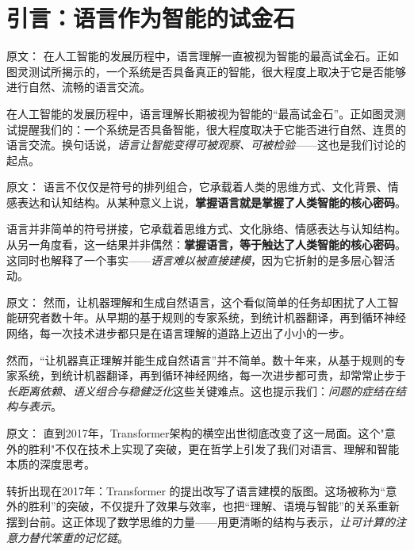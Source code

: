\section{引言：语言作为智能的试金石}

原文：
在人工智能的发展历程中，语言理解一直被视为智能的最高试金石。正如图灵测试所揭示的，一个系统是否具备真正的智能，很大程度上取决于它是否能够进行自然、流畅的语言交流。

在人工智能的发展历程中，语言理解长期被视为智能的“最高试金石”。正如图灵测试提醒我们的：一个系统是否具备智能，很大程度取决于它能否进行自然、连贯的语言交流。换句话说，\emph{语言让智能变得可被观察、可被检验}——这也是我们讨论的起点。



原文：
语言不仅仅是符号的排列组合，它承载着人类的思维方式、文化背景、情感表达和认知结构。从某种意义上说，\textbf{掌握语言就是掌握了人类智能的核心密码}。

语言并非简单的符号拼接，它承载着思维方式、文化脉络、情感表达与认知结构。从另一角度看，这一结果并非偶然：\textbf{掌握语言，等于触达了人类智能的核心密码}。这同时也解释了一个事实——\emph{语言难以被直接建模}，因为它折射的是多层心智活动。



原文：
然而，让机器理解和生成自然语言，这个看似简单的任务却困扰了人工智能研究者数十年。从早期的基于规则的专家系统，到统计机器翻译，再到循环神经网络，每一次技术进步都只是在语言理解的道路上迈出了小小的一步。

然而，“让机器真正理解并能生成自然语言”并不简单。数十年来，从基于规则的专家系统，到统计机器翻译，再到循环神经网络，每一次进步都可贵，却常常止步于\emph{长距离依赖、语义组合与稳健泛化}这些关键难点。这也提示我们：\emph{问题的症结在结构与表示}。



原文：
直到2017年，Transformer架构的横空出世彻底改变了这一局面。这个"意外的胜利"不仅在技术上实现了突破，更在哲学上引发了我们对语言、理解和智能本质的深度思考。

转折出现在2017年：Transformer 的提出改写了语言建模的版图。这场被称为“意外的胜利”的突破，不仅提升了效果与效率，也把“理解、语境与智能”的关系重新摆到台前。这正体现了数学思维的力量——用更清晰的结构与表示，\emph{让可计算的注意力替代笨重的记忆链}。



